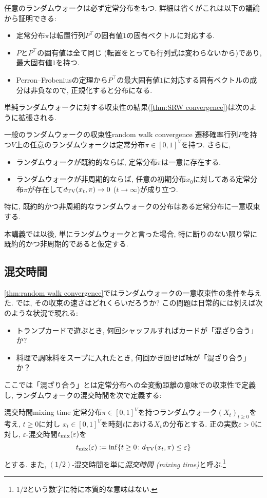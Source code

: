   任意のランダムウォークは必ず定常分布をもつ.
  詳細は省くがこれは以下の議論から証明できる:
    \begin{itemize}
    \item 定常分布$\pi$は転置行列$P^{\top}$の固有値$1$の固有ベクトルに対応する.
    \item $P$と$P^\top$の固有値は全て同じ (転置をとっても行列式は変わらないから)であり, 最大固有値$1$を持つ.
    \item Perron--Frobeniusの定理から$P^\top$の最大固有値$1$に対応する固有ベクトルの成分は非負なので, 正規化すると分布になる.
    \end{itemize}
  単純ランダムウォークに対する収束性の結果(\cref{thm:SRW convergence})は次のように拡張される.
  \begin{theorem}{一般のランダムウォークの収束性}{random walk convergence}
      遷移確率行列$P$を持つ$V$上の任意のランダムウォークは定常分布$\pi \in [0,1]^V$を持つ.
      さらに,
      \begin{itemize}
      \item ランダムウォークが既約的ならば, 定常分布$\pi$は一意に存在する.
      \item ランダムウォークが非周期的ならば, 任意の初期分布$x_0$に対してある定常分布$\pi$が存在して$d_{\mathrm{TV}}(x_t,\pi)\to 0$ ($t\to\infty$)が成り立つ.
      \end{itemize}

      特に, 既約的かつ非周期的なランダムウォークの分布はある定常分布に一意収束する.
  \end{theorem}

  本講義では以後, 単にランダムウォークと言った場合, 特に断りのない限り常に既約的かつ非周期的であると仮定する.

\subsection{混交時間}
\cref{thm:random walk convergence}ではランダムウォークの一意収束性の条件を与えた.
では, その収束の速さはどれくらいだろうか?
この問題は日常的には例えば次のような状況で現れる:
\begin{itemize}
  \item トランプカードで遊ぶとき, 何回シャッフルすればカードが「混ざり合う」か?
  \item 料理で調味料をスープに入れたとき, 何回かき回せば味が「混ざり合う」か？
\end{itemize}

ここでは「混ざり合う」とは定常分布への全変動距離の意味での収束性で定義し,
ランダムウォークの混交時間を次で定義する:
\begin{definition}{混交時間}{mixing time}
  定常分布$\pi \in [0,1]^V$を持つランダムウォーク$(X_t)_{t\ge 0}$を考え, $t\ge 0$に対し
  $x_t \in [0,1]^V$を時刻$t$における$X_t$の分布とする.
  正の実数$\varepsilon > 0$に対し, $\varepsilon$-混交時間$t_{\mathrm{mix}}(\varepsilon)$を
  \[
    \tmix(\varepsilon) \defeq \inf\cbra*{ t \ge 0 \colon \dtv(x_t, \pi) \le \varepsilon}
  \]
  とする.
  また, $(1/2)$-混交時間を単に\emph{混交時間 (mixing time)}と呼ぶ.\footnote{$1/2$という数字に特に本質的な意味はない.}
\end{definition}

